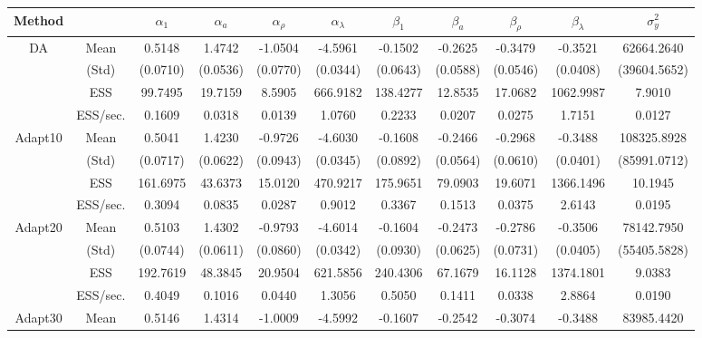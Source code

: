 {\setlength{\tabcolsep}{2pt}
{\footnotesize 
{ \renewcommand{\arraystretch}{1.2} 
\begin{table} 
\begin{tabular}{cc ccc ccc ccc} 
\hline 
 Method & &  $\alpha_{1}$ &  $\alpha_{a}$ &  $\alpha_{\rho}$ &  $\alpha_{\lambda}$ &  $\beta_{1}$ &  $\beta_{a}$ &  $\beta_{\rho}$ &  $\beta_{\lambda}$ &  $\sigma^{2}_{y}$  \\ \hline  \hline
\rowcolor{LightCyan} 
DA & Mean 
 & 0.5148  & 1.4742  & -1.0504  & -4.5961  & -0.1502  & -0.2625  & -0.3479  & -0.3521  & 62664.2640  \\  [0.75ex] 
 & (Std) 
 & (0.0710)  & (0.0536)  & (0.0770)  & (0.0344)  & (0.0643)  & (0.0588)  & (0.0546)  & (0.0408)  & (39604.5652)  \\  [0.75ex] 
 & ESS 
 & 99.7495  & 19.7159  & 8.5905  & 666.9182  & 138.4277  & 12.8535  & 17.0682  & 1062.9987  & 7.9010  \\  [0.75ex] 
[619.80 s]  & ESS/sec. 
 & 0.1609  & 0.0318  & 0.0139  & 1.0760  & 0.2233  & 0.0207  & 0.0275  & 1.7151  & 0.0127  \\  [1.3ex] 
\rowcolor{LightCyan} 
Adapt10 & Mean 
 & 0.5041  & 1.4230  & -0.9726  & -4.6030  & -0.1608  & -0.2466  & -0.2968  & -0.3488  & 108325.8928  \\  [0.75ex] 
 & (Std) 
 & (0.0717)  & (0.0622)  & (0.0943)  & (0.0345)  & (0.0892)  & (0.0564)  & (0.0610)  & (0.0401)  & (85991.0712)  \\  [0.75ex] 
 & ESS 
 & 161.6975  & 43.6373  & 15.0120  & 470.9217  & 175.9651  & 79.0903  & 19.6071  & 1366.1496  & 10.1945  \\  [0.75ex] 
[522.57 s]  & ESS/sec. 
 & 0.3094  & 0.0835  & 0.0287  & 0.9012  & 0.3367  & 0.1513  & 0.0375  & 2.6143  & 0.0195  \\  [1.3ex] 
\rowcolor{LightCyan} 
Adapt20 & Mean 
 & 0.5103  & 1.4302  & -0.9793  & -4.6014  & -0.1604  & -0.2473  & -0.2786  & -0.3506  & 78142.7950  \\  [0.75ex] 
 & (Std) 
 & (0.0744)  & (0.0611)  & (0.0860)  & (0.0342)  & (0.0930)  & (0.0625)  & (0.0731)  & (0.0405)  & (55405.5828)  \\  [0.75ex] 
 & ESS 
 & 192.7619  & 48.3845  & 20.9504  & 621.5856  & 240.4306  & 67.1679  & 16.1128  & 1374.1801  & 9.0383  \\  [0.75ex] 
[476.10 s]  & ESS/sec. 
 & 0.4049  & 0.1016  & 0.0440  & 1.3056  & 0.5050  & 0.1411  & 0.0338  & 2.8864  & 0.0190  \\  [1.3ex] 
\rowcolor{LightCyan} 
Adapt30 & Mean 
 & 0.5146  & 1.4314  & -1.0009  & -4.5992  & -0.1607  & -0.2542  & -0.3074  & -0.3488  & 83985.4420  \\  [0.75ex] 

\end{tabular}
\end{table}}}}
